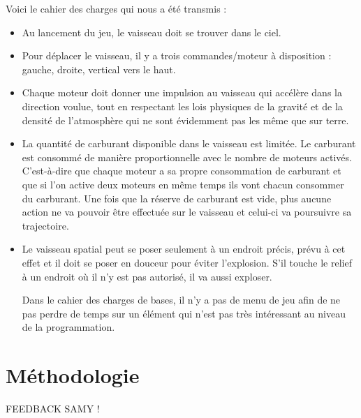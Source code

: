 Voici le cahier des charges qui nous a été transmis :
\begin{itemize}
\item	Au lancement du jeu, le vaisseau doit se trouver dans le ciel.
\item	Pour déplacer le vaisseau, il y a trois commandes/moteur à disposition : gauche, droite, vertical vers le haut.
\item	Chaque moteur doit donner une impulsion au vaisseau qui accélère dans la direction voulue, tout en respectant les lois physiques de la gravité et de la densité de l’atmosphère qui ne sont évidemment pas les même que sur terre.
\item	La quantité de carburant disponible dans le vaisseau est limitée. Le carburant est consommé de manière proportionnelle avec le nombre de moteurs activés. C’est-à-dire que chaque moteur a sa propre consommation de carburant et que si l’on active deux moteurs en même temps ils vont chacun consommer du carburant. Une fois que la réserve de carburant est vide, plus aucune action ne va pouvoir être effectuée sur le vaisseau et celui-ci va poursuivre sa trajectoire.
\item	Le vaisseau spatial peut se poser seulement à un endroit précis, prévu à cet effet et il doit se poser en douceur pour éviter l’explosion. S’il touche le relief à un endroit où il n’y est pas autorisé, il va aussi exploser.

Dans le cahier des charges de bases, il n’y a pas de menu de jeu afin de ne pas perdre de temps sur un élément qui n’est pas très intéressant au niveau de la programmation.
\end{itemize}

\section{Méthodologie}

FEEDBACK SAMY !
